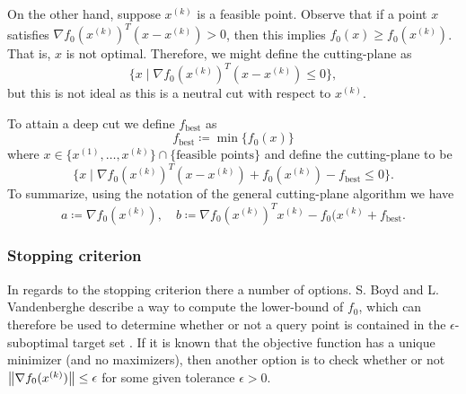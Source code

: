 \documentclass[11pt]{amsart}
\theoremstyle{definition}
\theoremstyle{remark}
\newcommand{\transpose}{T}
\begin{document}
        On the other hand, suppose $x^{(k)}$ is a feasible point. Observe that if a point $x$ satisfies $\nabla f_0(x^{(k)})^\transpose(x-x^{(k)}) > 0$, then this implies $f_0(x) \geq f_0(x^{(k)})$. That is, $x$ is not optimal. Therefore, we might define the cutting-plane as 
        \begin{equation*}
            \{x \;|\; \nabla f_0(x^{(k)})^\transpose(x-x^{(k)}) \leq 0\},
        \end{equation*}
        but this is not ideal as this is a neutral cut with respect to $x^{(k)}$. 

        To attain a deep cut we define $f_\text{best}$ as
        \begin{equation*}
            f_\text{best} \coloneqq \min \{f_0(x)\}
        \end{equation*}
        where $x \in \{x^{(1)}, \dots, x^{(k)}\} \cap \{\text{feasible points}\}$ and define the cutting-plane to be
        \begin{equation*}
            \{x \;|\; \nabla f_0(x^{(k)})^\transpose(x-x^{(k)}) + f_0(x^{(k)}) - f_\text{best} \leq 0\}.
        \end{equation*}
        To summarize, using the notation of the general cutting-plane algorithm we have
        \begin{equation}
            a \coloneqq \nabla f_0(x^{(k)}), \quad b \coloneqq \nabla f_0(x^{(k)})^\transpose x^{(k)} - f_0(x^{(k)} + f_\text{best}.
        \end{equation}

        \subsubsection*{Stopping criterion}
        In regards to the stopping criterion there a number of options. S. Boyd and L. Vandenberghe describe a way to compute the lower-bound of $f_0$, which can therefore be used to determine whether or not a query point is contained in the $\epsilon$-suboptimal target set \cite[Section 7]{BV11}. If it is known that the objective function has a unique minimizer (and no maximizers), then another option is to check whether or not $\norm{\nabla f_0(x^{(k)})} \leq \epsilon$ for some given tolerance $\epsilon > 0$. 
\end{document}
